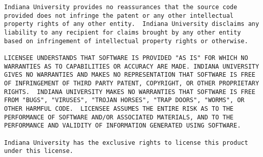 \begin{verbatim}
Indiana University provides no reassurances that the source code
provided does not infringe the patent or any other intellectual
property rights of any other entity.  Indiana University disclaims any
liability to any recipient for claims brought by any other entity
based on infringement of intellectual property rights or otherwise.

LICENSEE UNDERSTANDS THAT SOFTWARE IS PROVIDED "AS IS" FOR WHICH NO
WARRANTIES AS TO CAPABILITIES OR ACCURACY ARE MADE. INDIANA UNIVERSITY
GIVES NO WARRANTIES AND MAKES NO REPRESENTATION THAT SOFTWARE IS FREE
OF INFRINGEMENT OF THIRD PARTY PATENT, COPYRIGHT, OR OTHER PROPRIETARY
RIGHTS.  INDIANA UNIVERSITY MAKES NO WARRANTIES THAT SOFTWARE IS FREE
FROM "BUGS", "VIRUSES", "TROJAN HORSES", "TRAP DOORS", "WORMS", OR
OTHER HARMFUL CODE.  LICENSEE ASSUMES THE ENTIRE RISK AS TO THE
PERFORMANCE OF SOFTWARE AND/OR ASSOCIATED MATERIALS, AND TO THE
PERFORMANCE AND VALIDITY OF INFORMATION GENERATED USING SOFTWARE.

Indiana University has the exclusive rights to license this product
under this license.
\end{verbatim}

